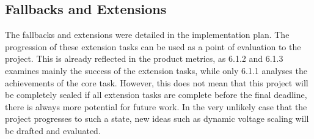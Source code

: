 \subsection{Fallbacks and Extensions}
The fallbacks and extensions were detailed in the implementation plan.
The progression of these extension tasks can be used as a point of evaluation to the project.
This is already reflected in the product metrics, as 6.1.2 and 6.1.3 examines mainly the success of the extension tasks, while only 6.1.1 analyses the achievements of the core task.
However, this does not mean that this project will be completely sealed if all extension tasks are complete before the final deadline, there is always more potential for future work.
In the very unlikely case that the project progresses to such a state, new ideas such as dynamic voltage scaling will be drafted and evaluated.
